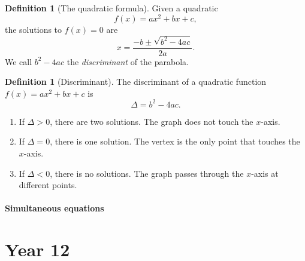 \documentclass[12pt]{book}
\theoremstyle{definition}
\newtheorem{defi}[theo]{Definition}
\begin{document}
  \begin{defi}[The quadratic formula]
    Given a quadratic \[f(x)=ax^2+bx+c,\] the solutions to $f(x)=0$ are
    \[x=\frac{-b\pm\sqrt{b^2-4ac}}{2a}.\] We call $b^2-4ac$ the \textit{discriminant} of the parabola.
  \end{defi}
  \begin{defi}[Discriminant]
    The discriminant of a quadratic function $f(x)=ax^2+bx+c$ is \[\Delta=b^2-4ac.\]
    \begin{enumerate}
      \item If $\Delta>0$, there are two solutions. The graph does not touch the $x$-axis.
      \item If $\Delta=0$, there is one solution. The vertex is the only point that touches the $x$-axis.
      \item If $\Delta<0$, there is no solutions. The graph passes through the $x$-axis at different points.
    \end{enumerate}
  \end{defi}
\subsection{Simultaneous equations}
\part{Year 12}
\end{document}

